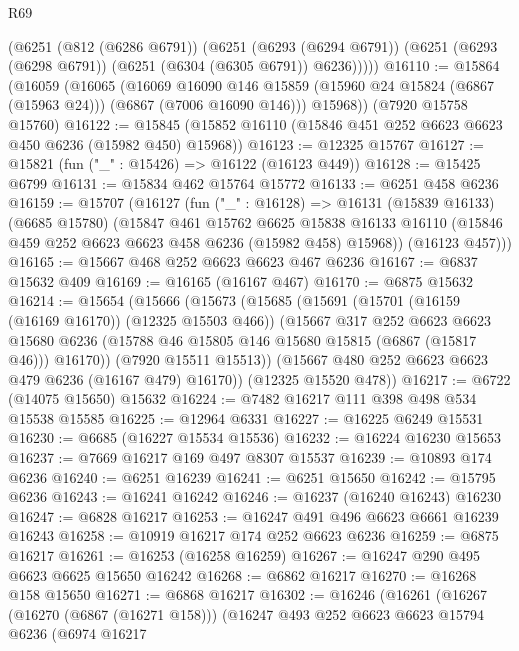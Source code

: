 \begin{lexlean}{R69}
\begin{coremodule}
{      (@6251
        (@812 (@6286 @6791))
        (@6251
          (@6293 (@6294 @6791))
          (@6251 (@6293 (@6298 @6791)) (@6251 (@6304 (@6305 @6791)) @6236)))))
@16110 := @15864
    (@16059
      (@16065
        (@16069
          @16090
          @146
          @15859
          (@15960 @24 @15824 (@6867 (@15963 @24)))
          (@6867 (@7006 @16090 @146)))
        @15968))
    (@7920 @15758 @15760)
@16122 := @15845 (@15852 @16110 (@15846 @451 @252 @6623 @6623 @450 @6236 (@15982 @450) @15968))
@16123 := @12325 @15767
@16127 := @15821 (fun ("_" : @15426) => @16122 (@16123 @449))
@16128 := @15425 @6799
@16131 := @15834 @462 @15764 @15772
@16133 := @6251 @458 @6236
@16159 := @15707
    (@16127
      (fun ("_" : @16128) =>
      @16131
        (@15839 @16133)
        (@6685 @15780)
        (@15847
          @461
          @15762
          @6625
          @15838
          @16133
          @16110
          (@15846 @459 @252 @6623 @6623 @458 @6236 (@15982 @458) @15968))
        (@16123 @457)))
@16165 := @15667 @468 @252 @6623 @6623 @467 @6236
@16167 := @6837 @15632 @409
@16169 := @16165 (@16167 @467)
@16170 := @6875 @15632
@16214 := @15654
    (@15666
      (@15673
        (@15685
          (@15691
            (@15701 (@16159 (@16169 @16170)) (@12325 @15503 @466))
            (@15667
              @317
              @252
              @6623
              @6623
              @15680
              @6236
              (@15788 @46 @15805 @146 @15680 @15815 (@6867 (@15817 @46)))
              @16170))
          (@7920 @15511 @15513))
        (@15667 @480 @252 @6623 @6623 @479 @6236 (@16167 @479) @16170))
      (@12325 @15520 @478))
@16217 := @6722 (@14075 @15650) @15632
@16224 := @7482 @16217 @111 @398 @498 @534 @15538 @15585
@16225 := @12964 @6331
@16227 := @16225 @6249 @15531
@16230 := @6685 (@16227 @15534 @15536)
@16232 := @16224 @16230 @15653
@16237 := @7669 @16217 @169 @497 @8307 @15537
@16239 := @10893 @174 @6236
@16240 := @6251 @16239
@16241 := @6251 @15650
@16242 := @15795 @6236
@16243 := @16241 @16242
@16246 := @16237 (@16240 @16243) @16230
@16247 := @6828 @16217
@16253 := @16247 @491 @496 @6623 @6661 @16239 @16243
@16258 := @10919 @16217 @174 @252 @6623 @6236
@16259 := @6875 @16217
@16261 := @16253 (@16258 @16259)
@16267 := @16247 @290 @495 @6623 @6625 @15650 @16242
@16268 := @6862 @16217
@16270 := @16268 @158 @15650
@16271 := @6868 @16217
@16302 := @16246
    (@16261
      (@16267
        (@16270 (@6867 (@16271 @158)))
        (@16247
          @493
          @252
          @6623
          @6623
          @15794
          @6236
          (@6974
            @16217
}
\end{coremodule}
\end{lexlean}
